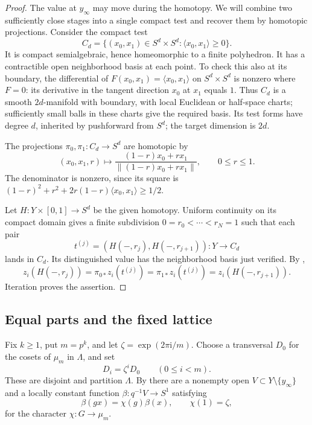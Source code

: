 \begin{proof}
The value at $y_\infty$ may move during the homotopy.  We will combine
two sufficiently close stages into a single compact test and recover
them by homotopic projections.
Consider the compact test
\begin{equation}\label{char:close-pair}
 C_d=\{(x_0,x_1)\in S^d\times S^d:
                     \langle x_0,x_1\rangle\geq0\}.
\end{equation}
It is compact semialgebraic, hence homeomorphic to a finite polyhedron.
It has a contractible open neighborhood basis at each point.  To
check this also at its boundary, the differential of
$F(x_0,x_1)=\langle x_0,x_1\rangle$ on $S^d\times S^d$ is nonzero
where $F=0$: its derivative in the tangent direction $x_0$ at $x_1$
equals $1$.  Thus $C_d$ is a smooth $2d$-manifold with boundary, with local
Euclidean or half-space charts; sufficiently small balls in these
charts give the required basis.  Its test forms have degree $d$,
inherited by pushforward from $S^d$; the target dimension is $2d$.

The projections $\pi_0,\pi_1:C_d\to S^d$ are homotopic by
\[
 (x_0,x_1,r)\longmapsto
 \frac{(1-r)x_0+rx_1}{\|(1-r)x_0+rx_1\|},\qquad 0\leq r\leq1.
\]
The denominator is nonzero, since its square is
$(1-r)^2+r^2+2r(1-r)\langle x_0,x_1\rangle\geq1/2$.

Let $H:Y\times[0,1]\to S^d$ be the given homotopy.  Uniform continuity
on its compact domain gives a finite subdivision
$0=r_0<\cdots<r_N=1$ such that each pair
\[
 t^{(j)}=(H(-,r_j),H(-,r_{j+1})):Y\longrightarrow C_d
\]
lands in $C_d$.  Its distinguished value has the neighborhood basis just verified.
By ,
\[
 z_i(H(-,r_j))
   =\pi_{0*}z_i(t^{(j)})
   =\pi_{1*}z_i(t^{(j)})
   =z_i(H(-,r_{j+1})).
\]
Iteration proves the assertion.
\end{proof}

\subsection{Equal parts and the fixed lattice}

Fix $k\geq1$, put $m=p^k$, and let
$\zeta=\exp(2\pi\mathrm i/m)$.  Choose a transversal $D_0$ for the
cosets of $\mu_m$ in $\Lambda$, and set
\begin{equation}\label{char:cyclic-partition}
 D_i=\zeta^iD_0\qquad(0\leq i<m).
\end{equation}
These are disjoint and partition $\Lambda$.
By  there are a nonempty open
$V\subset Y\setminus\{y_\infty\}$ and a locally constant function
$\beta:q^{-1}V\to S^1$ satisfying
\[
 \beta(gx)=\chi(g)\beta(x),\qquad \chi(1)=\zeta,
\]
for the character $\chi:G\to\mu_m$.

